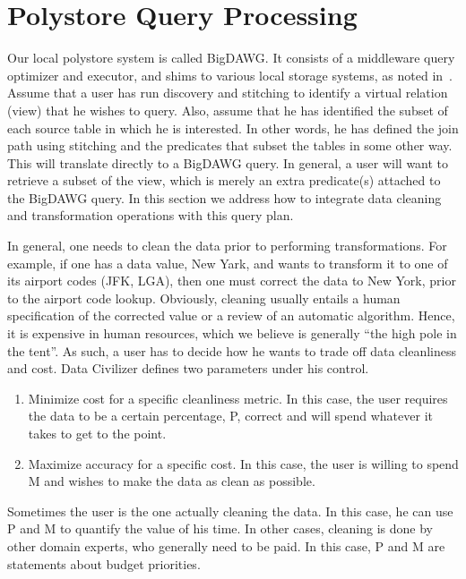 \section{Polystore Query Processing}
\label{sec:curating}

Our local polystore system is called BigDAWG. It consists of a middleware query
optimizer and executor, and shims to various local storage systems, as noted
in~\cite{DBLP:journals/sigmod/DugganESBHKMMMZ15,
DBLP:journals/pvldb/ElmoreDSBCGHHKK15}.  Assume that a user has run discovery
and stitching to identify a virtual relation (view) that he wishes to query.
Also, assume that he has identified the subset of each source table in which he
is interested.  In other words, he has defined the join path using stitching and
the predicates that subset the tables in some other way.  This will translate
directly to a BigDAWG query.  In general, a user will want to retrieve a subset
of the view, which is merely an extra predicate(s) attached to the BigDAWG
query. In this section we address how to integrate data cleaning and
transformation operations with this query plan.

In general, one needs to clean the data prior to performing transformations.
For example, if one has a data value, New Yark, and wants to transform it to one
of its airport codes (JFK, LGA), then one must correct the data to New York,
prior to the airport code lookup.  Obviously, cleaning usually entails a human
specification of the corrected value or a review of an automatic algorithm.
Hence, it is expensive in human resources, which we believe is generally ``the
high pole in the tent''.  As such, a user has to decide how he wants to trade off
data cleanliness and cost.  Data Civilizer defines two parameters under his
control.

\begin{enumerate}
\item Minimize cost for a specific cleanliness metric.  In this case, the
user requires the data to be a certain percentage, P, correct and will spend
whatever it takes to get to the point.
\item Maximize accuracy for a specific cost.  In this case, the user is
willing to spend M and wishes to make the data as clean as possible.
\end{enumerate}

Sometimes the user is the one actually cleaning the data. In this case, he can
use P and M to quantify the value of his time. In other cases, cleaning is done
by other domain experts, who generally need to be paid. In this case, P and M
are statements about budget priorities.


